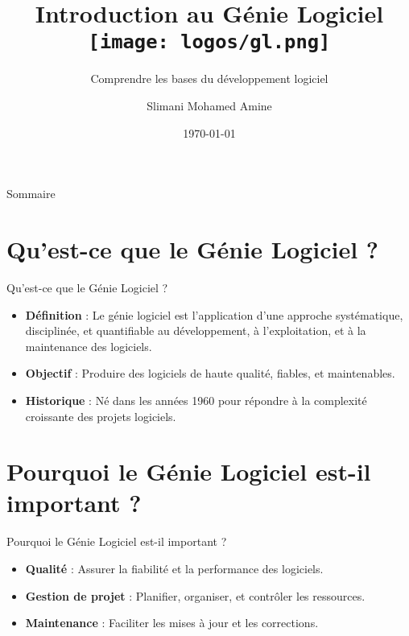 \documentclass{clbeamer2024}
\title{
        Introduction au Génie Logiciel
	\texttt{[image: logos/gl.png]} \hfill
}
\subtitle{Comprendre les bases du développement logiciel}
\author{Slimani Mohamed Amine}
\institute{EHTP}
\date{\today}
\begin{document}
	\setcounter{framenumber}{-1}
	\frame{\titlepage}
	
	
	
	\begin{frame}{Sommaire}
		\tableofcontents
	\end{frame}
	
	
	\section{Qu'est-ce que le Génie Logiciel ?}
	\begin{frame}{Qu'est-ce que le Génie Logiciel ?}
		\begin{itemize}
			\item \textbf{Définition} : Le génie logiciel est l'application d'une approche systématique, disciplinée, et quantifiable au développement, à l'exploitation, et à la maintenance des logiciels.
			\item \textbf{Objectif} : Produire des logiciels de haute qualité, fiables, et maintenables.
			\item \textbf{Historique} : Né dans les années 1960 pour répondre à la complexité croissante des projets logiciels.
		\end{itemize}
	\end{frame}
	
	
	\section{Pourquoi le Génie Logiciel est-il important ?}
	\begin{frame}{Pourquoi le Génie Logiciel est-il important ?}
		\begin{itemize}
			\item \textbf{Qualité} : Assurer la fiabilité et la performance des logiciels.
			\item \textbf{Gestion de projet} : Planifier, organiser, et contrôler les ressources.
			\item \textbf{Maintenance} : Faciliter les mises à jour et les corrections.
		\end{itemize}
	\end{frame}
	
\end{document}
